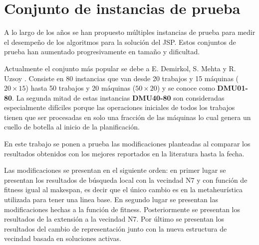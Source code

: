 \section{Conjunto de instancias de prueba}
A lo largo de los años se han propuesto múltiples instancias de prueba para medir el desempeño de los algoritmos para la solución del JSP. Estos conjuntos de prueba han aumentado progresivamente en tamaño y dificultad. 

Actualmente el conjunto más popular se debe a E. Demirkol, S. Mehta y R. Uzsoy \cite{demirkol1997computational}. Consiste en 80 instancias que van desde 20 trabajos y 15 máquinas ($20\times 15$) hasta 50 trabajos y 20 máquinas ($50\times 20$) y se conoce como \textbf{DMU01-80}. La segunda mitad de estas instancias \textbf{DMU40-80} son consideradas especialmente difíciles porque las operaciones iniciales de todos los trabajos tienen que ser procesadas en solo una fracción de las máquinas lo cual genera un cuello de botella al inicio de la planificación.

En este trabajo se ponen a prueba las modificaciones planteadas al comparar los resultados obtenidos con los mejores reportados en la literatura hasta la fecha.

Las modificaciones se presentan en el siguiente orden: en primer lugar se presentan los resultados de búsqueda local con la vecindad N7 y con función de fitness igual al makespan, es decir que el único cambio es en la metaheurística utilizada para tener una linea base. En segundo lugar se presentan las modificaciones hechas a la función de fitness. Posteriormente se presentan los resultados de la extensión a la vecindad N7. Por último se presentan los resultados del cambio de representación junto con la nueva estructura de vecindad basada en soluciones activas.



